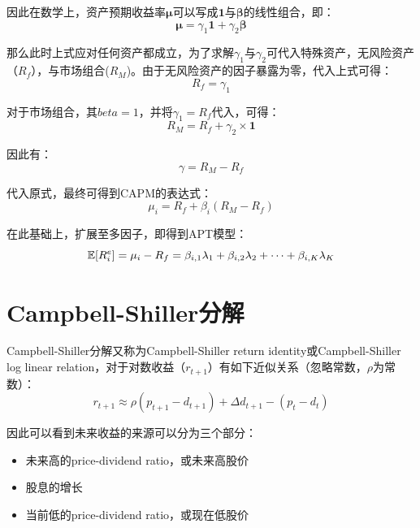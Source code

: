 \documentclass[11pt]{article}
\begin{document}
\begin{appendices}
因此在数学上，资产预期收益率$\bm{\mu}$可以写成$\bm{1}$与$\bm{\beta}$的线性组合，即：
\begin{equation*}
    \bm{\mu} = \gamma_1 \bm{1} + \gamma_2 \bm{\beta}
\end{equation*}

那么此时上式应对任何资产都成立，为了求解$\gamma_1$与$\gamma_2$可代入特殊资产，无风险资产（$R_f$），与市场组合($R_M$)。由于无风险资产的因子暴露为零，代入上式可得：
\begin{equation*}
    R_f = \gamma_1
\end{equation*}

对于市场组合，其$beta=1$，并将$\gamma_1 = R_f$代入，可得：
\begin{equation*}
    R_M = R_f + \gamma_2 \times \bm{1}
\end{equation*}

因此有：
\begin{equation*}
    \gamma = R_M - R_f
\end{equation*}

代入原式，最终可得到CAPM的表达式：
\begin{equation*}
    \mu_i = R_f + \beta_i(R_M - R_f)
\end{equation*}

在此基础上，扩展至多因子，即得到APT模型：
\begin{equation*}
    \mathbb{E}[R_{i}^{e}] = \mu_i - R_f = \beta_{i,1} \lambda_1 + \beta_{i,2} \lambda_2 + \dots + \beta_{i,K} \lambda_K
\end{equation*}

\section{Campbell-Shiller分解}

Campbell-Shiller分解又称为Campbell-Shiller return identity或Campbell-Shiller log linear relation，对于对数收益（$r_{t+1}$）有如下近似关系（忽略常数，$\rho$为常数）：
\begin{equation*}
    r_{t+1} \approx \rho(p_{t+1} - d_{t+1}) + \Delta d_{t+1} - (p_t - d_t)
\end{equation*}

因此可以看到未来收益的来源可以分为三个部分：
\begin{itemize}
    \item 未来高的price-dividend ratio，或未来高股价
    \item 股息的增长
    \item 当前低的price-dividend ratio，或现在低股价
\end{itemize}


\end{appendices}
\end{document}
